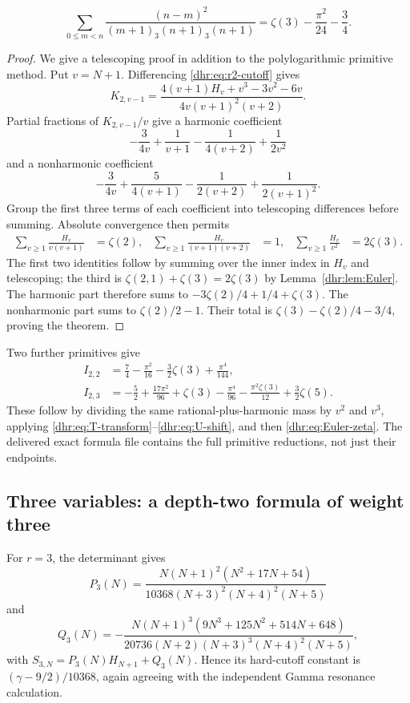 \begin{theorem}
\label{dhr:thm:first-evaluation}
\begin{equation}\label{dhr:eq:I21}
 \boxed{\displaystyle
 \sum_{0\leq m<n}
 \frac{(n-m)^2}{(m+1)_3(n+1)_3(n+1)}
 =\zeta(3)-\frac{\pi^2}{24}-\frac34.}
\end{equation}
\end{theorem}
\begin{proof}
We give a telescoping proof in addition to the polylogarithmic
primitive method. Put $v=N+1$. Differencing \eqref{dhr:eq:r2-cutoff}
gives
\[
 K_{2,v-1}=\frac{4(v+1)H_v+v^3-3v^2-6v}
 {4v(v+1)^2(v+2)}.
\]
Partial fractions of $K_{2,v-1}/v$ give a harmonic coefficient
\[
 -\frac3{4v}+\frac1{v+1}-\frac1{4(v+2)}+\frac1{2v^2}
\]
and a nonharmonic coefficient
\[
 -\frac3{4v}+\frac5{4(v+1)}-\frac1{2(v+2)}
                                      +\frac1{2(v+1)^2}.
\]
Group the first three terms of each coefficient into telescoping
differences before summing. Absolute convergence then permits
\begin{align*}
 \sum_{v\geq1}\frac{H_v}{v(v+1)}&=\zeta(2),&
 \sum_{v\geq1}\frac{H_v}{(v+1)(v+2)}&=1,&
 \sum_{v\geq1}\frac{H_v}{v^2}&=2\zeta(3).
\end{align*}
The first two identities follow by summing over the inner index in
$H_v$ and telescoping; the third is
$\zeta(2,1)+\zeta(3)=2\zeta(3)$ by
Lemma~\ref{dhr:lem:Euler}. The harmonic part therefore sums to
$-3\zeta(2)/4+1/4+\zeta(3)$. The nonharmonic part sums to
$\zeta(2)/2-1$. Their total is
$\zeta(3)-\zeta(2)/4-3/4$, proving the theorem.
\end{proof}

Two further primitives give
\begin{align}
 I_{2,2}&=\frac74-\frac{\pi^2}{16}-\frac32\zeta(3)
                            +\frac{\pi^4}{144},\label{dhr:eq:I22}\\
 I_{2,3}&=-\frac52+\frac{17\pi^2}{96}+\zeta(3)
             -\frac{\pi^4}{96}-\frac{\pi^2\zeta(3)}{12}
             +\frac32\zeta(5).
 \label{dhr:eq:I23}
\end{align}
These follow by dividing the same rational-plus-harmonic mass by
$v^2$ and $v^3$, applying \eqref{dhr:eq:T-transform}--\eqref{dhr:eq:U-shift},
and then \eqref{dhr:eq:Euler-zeta}. The delivered exact formula file
contains the full primitive reductions, not just their endpoints.

\subsection{Three variables: a depth-two formula of weight three}
For $r=3$, the determinant gives
\begin{equation}\label{dhr:eq:r3-P}
 P_3(N)=\frac{N(N+1)^2(N^2+17N+54)}
 {10368(N+3)^2(N+4)^2(N+5)}
\end{equation}
and
\begin{equation}\label{dhr:eq:r3-Q}
 Q_3(N)=-\frac{N(N+1)^3(9N^3+125N^2+514N+648)}
 {20736(N+2)(N+3)^3(N+4)^2(N+5)},
\end{equation}
with $S_{3,N}=P_3(N)H_{N+1}+Q_3(N)$. Hence its hard-cutoff
constant is $(\gamma-9/2)/10368$, again agreeing with the independent
Gamma resonance calculation.

